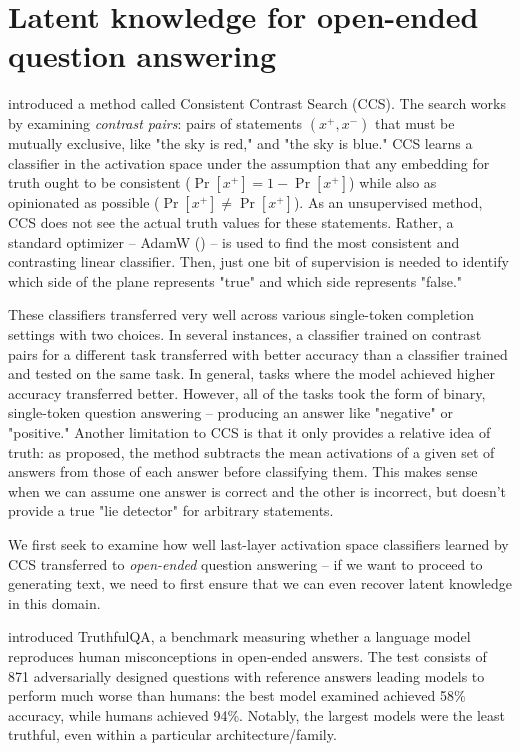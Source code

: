 \documentclass{article}
\begin{document}
\section{Latent knowledge for open-ended question answering}



\cite{ccs} introduced a method called Consistent Contrast Search (CCS). The search works by examining {\em contrast pairs}: pairs of statements $(x^+, x^-)$ that must be mutually exclusive, like "the sky is red," and "the sky is blue." CCS learns a classifier in the activation space under the assumption that any embedding for truth ought to be consistent ($\Pr [x^+] = 1-\Pr [x^+]$) while also as opinionated as possible ($\Pr [x^+] \not = \Pr [x^+]$). As an unsupervised method, CCS does not see the actual truth values for these statements. Rather, a standard optimizer -- AdamW (\cite{loshchilov2019decoupled}) -- is used to find the most consistent and contrasting linear classifier. Then, just one bit of supervision is needed to identify which side of the plane represents "true" and which side represents "false."

These classifiers transferred very well across various single-token completion settings with two choices. In several instances, a classifier trained on contrast pairs for a different task transferred with better accuracy than a classifier trained and tested on the same task. In general, tasks where the model achieved higher accuracy transferred better. However, all of the tasks took the form of binary, single-token question answering -- producing an answer like "negative" or "positive." Another limitation to CCS is that it only provides a relative idea of truth: as proposed, the method subtracts the mean activations of a given set of answers from those of each answer before classifying them. This makes sense when we can assume one answer is correct and the other is incorrect, but doesn't provide a true "lie detector" for arbitrary statements.

We first seek to examine how well last-layer activation space classifiers learned by CCS transferred to {\em open-ended} question answering -- if we want to proceed to generating text, we need to first ensure that we can even recover latent knowledge in this domain.

\cite{evans2021truthful} introduced TruthfulQA, a benchmark measuring whether a language model reproduces human misconceptions in open-ended answers. The test consists of 871 adversarially designed questions with reference answers leading models to perform much worse than humans: the best model examined achieved 58\% accuracy, while humans achieved 94\%. Notably, the largest models were the least truthful, even within a particular architecture/family.
\end{document}
